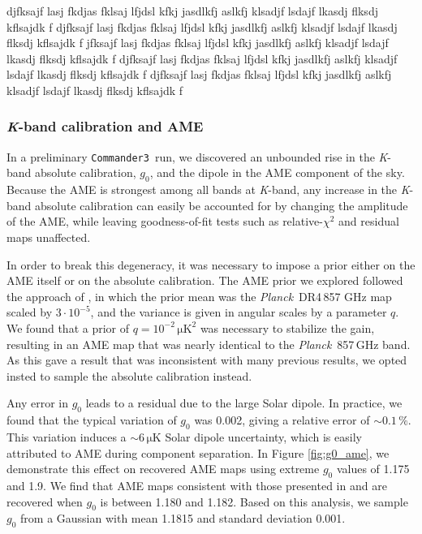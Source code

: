 \documentclass[twocolumn]{../../common/aa}
\def\Planck{\emph{Planck}}
\def\commanderthree{\texttt{Commander3}}
\newcommand{\K}[0]{\textit K}
\begin{document}
djfksajf lasj fkdjas fklsaj lfjdsl kfkj jasdlkfj aslkfj klsadjf lsdajf lkasdj flksdj kflsajdk f
djfksajf lasj fkdjas fklsaj lfjdsl kfkj jasdlkfj aslkfj klsadjf lsdajf lkasdj flksdj kflsajdk f
jfksajf lasj fkdjas fklsaj lfjdsl kfkj jasdlkfj aslkfj klsadjf lsdajf lkasdj flksdj kflsajdk f
djfksajf lasj fkdjas fklsaj lfjdsl kfkj jasdlkfj aslkfj klsadjf lsdajf lkasdj flksdj kflsajdk f
djfksajf lasj fkdjas fklsaj lfjdsl kfkj jasdlkfj aslkfj klsadjf lsdajf lkasdj flksdj kflsajdk f

\subsubsection{\K-band calibration and AME}
\label{sec:kband_correlation}

In a preliminary \commanderthree\ run, we discovered an unbounded rise in the
\K-band absolute calibration, $g_0$, and the dipole in the AME component of the sky. Because the AME is strongest among all bands at \K-band, any increase in the \K-band absolute calibration can easily be accounted for by changing the amplitude of the AME, while leaving goodness-of-fit tests such as relative-$\chi^2$ and residual maps unaffected.

In order to break this degeneracy, it was necessary to impose a prior either on the AME itself or on the absolute calibration. The AME prior we explored followed the approach of \citet{bp13}, in which the prior mean was the \Planck\ DR4\,857 GHz map scaled by $3\cdot10^{-5}$, and the variance is given in angular scales by a parameter $q$. We found that a prior of $q=10^{-2}\,\mathrm{\mu K}^2$ was necessary to stabilize the gain, resulting in an AME map that was nearly identical to the \Planck\ 857\,GHz band. As this gave a result that was inconsistent with many previous results, we opted insted to sample the absolute calibration instead.

Any error in $g_0$ leads to a residual due to the large Solar dipole. In practice, we found that the typical variation of $g_0$ was 0.002, giving a relative error of $\sim0.1\,\%$. This variation induces a $\sim6\,\mathrm{\mu K}$ Solar dipole uncertainty, which is easily attributed to AME during component separation. In Figure \ref{fig:g0_ame}, we demonstrate this effect on recovered AME maps using extreme $g_0$ values of 1.175 and 1.9. We find that AME maps consistent with those presented in \citet{bennett2012} and \citet{planck2014-a12} are recovered when $g_0$ is between 1.180 and 1.182. Based on this analysis, we sample $g_0$ from a Gaussian with mean 1.1815 and standard deviation 0.001.
\end{document}
